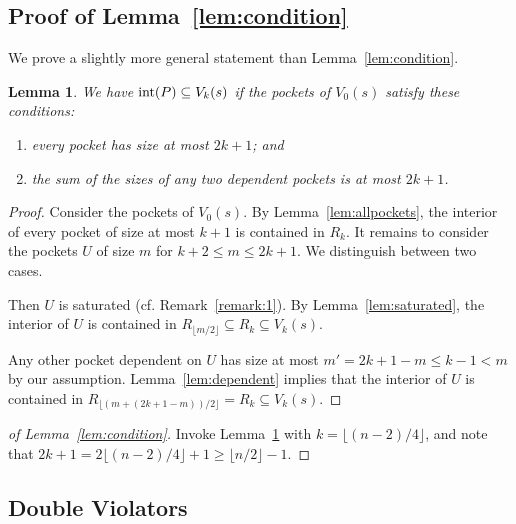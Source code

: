 \documentclass[12pt]{article}
\newcommand{\floor}[1]{{\lfloor #1 \rfloor}}
\newtheorem{lemma}{Lemma}
\begin{document}
\subsection{Proof of Lemma~\ref{lem:condition}}
We prove a slightly more general statement than Lemma~\ref{lem:condition}.

\begin{lemma}\label{lem:condition+}
We have ${\rm int}(P)\subseteq V_k(s)$ if the pockets of $V_0(s)$ satisfy these conditions:
\begin{enumerate}\itemsep -2pt
    \item every pocket has size at most $2k+1$; and
    \item the sum of the sizes of any two dependent pockets is at most $2k+1$.
\end{enumerate}
\end{lemma}
\begin{proof}
Consider the pockets of $V_0(s)$. By Lemma~\ref{lem:allpockets},
the interior of every pocket of size at most $k+1$ is contained in $R_k$.
It remains to consider the pockets $U$ of size $m$ for $k+2\leq m\leq 2k+1$.
We distinguish between two cases.

 Then $U$ is saturated (cf. Remark~\ref{remark:1}).
By Lemma~\ref{lem:saturated}, the interior of $U$ is
contained in $R_{\floor{m/2}}\subseteq R_k\subseteq V_k(s)$.

Any other pocket dependent on $U$ has size at most
  $m'=2k+1-m \leq k-1 < m$ by our assumption.
Lemma~\ref{lem:dependent} implies that
  the interior of $U$ is contained in $R_{\floor{(m+(2k+1-m))/2}}=R_k\subseteq V_k(s)$.
\end{proof}

\begin{proof}[of Lemma~\ref{lem:condition}]
Invoke Lemma~\ref{lem:condition+} with $k=\floor{(n-2)/4}$, and note that $2k+1=2\floor{(n-2)/4}+1\geq \floor{n/2}-1$.
\end{proof}

\subsection{Double Violators}
\label{ssec:double}
\end{document}
